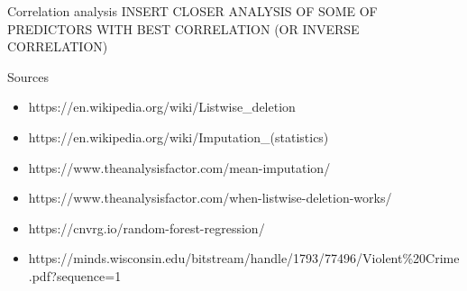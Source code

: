\documentclass{beamer}
\begin{document}
	\begin{frame}{Correlation analysis}
		INSERT CLOSER ANALYSIS OF SOME OF PREDICTORS WITH BEST CORRELATION (OR INVERSE CORRELATION)
	\end{frame}
	\begin{frame}{Sources}
		\begin{itemize}
			\item https://en.wikipedia.org/wiki/Listwise\_deletion
			\item https://en.wikipedia.org/wiki/Imputation\_(statistics)
			\item https://www.theanalysisfactor.com/mean-imputation/
			\item https://www.theanalysisfactor.com/when-listwise-deletion-works/
			\item https://cnvrg.io/random-forest-regression/
			\item https://minds.wisconsin.edu/bitstream/handle/1793/77496/Violent\%20Crime.pdf?sequence=1
		\end{itemize}
	\end{frame}
\end{document}
